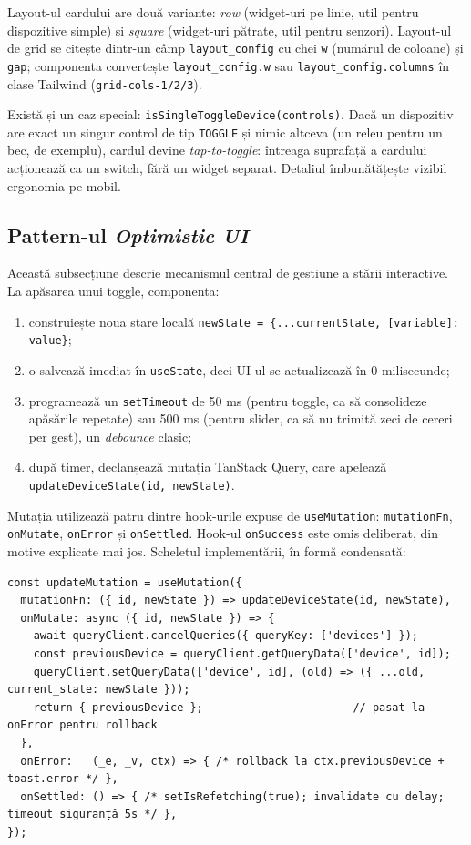 Layout-ul cardului are două variante: \emph{row} (widget-uri pe linie, util pentru dispozitive simple) și \emph{square} (widget-uri pătrate, util pentru senzori). Layout-ul de grid se citește dintr-un câmp \texttt{layout\_config} cu chei \texttt{w} (numărul de coloane) și \texttt{gap}; componenta convertește \texttt{layout\_config.w} sau \texttt{layout\_config.columns} în clase Tailwind (\texttt{grid-cols-1/2/3}).

Există și un caz special: \texttt{isSingleToggleDevice(controls)}. Dacă un dispozitiv are exact un singur control de tip \texttt{TOGGLE} și nimic altceva (un releu pentru un bec, de exemplu), cardul devine \emph{tap-to-toggle}: întreaga suprafață a cardului acționează ca un switch, fără un widget separat. Detaliul îmbunătățește vizibil ergonomia pe mobil.

\subsection{Pattern-ul \textit{Optimistic UI}}
Această subsecțiune descrie mecanismul central de gestiune a stării interactive. La apăsarea unui toggle, componenta:
\begin{enumerate}
    \item construiește noua stare locală \texttt{newState = \{...currentState, [variable]: value\}};
    \item o salvează imediat în \texttt{useState}, deci UI-ul se actualizează în 0 milisecunde;
    \item programează un \texttt{setTimeout} de 50 ms (pentru toggle, ca să consolideze apăsările repetate) sau 500 ms (pentru slider, ca să nu trimită zeci de cereri per gest), un \textit{debounce} clasic;
    \item după timer, declanșează mutația TanStack Query, care apelează \texttt{updateDeviceState(id, newState)}.
\end{enumerate}

Mutația utilizează patru dintre hook-urile expuse de \texttt{useMutation}: \texttt{mutationFn}, \texttt{onMutate}, \texttt{onError} și \texttt{onSettled}. Hook-ul \texttt{onSuccess} este omis deliberat, din motive explicate mai jos. Scheletul implementării, în formă condensată:
\begin{verbatim}
const updateMutation = useMutation({
  mutationFn: ({ id, newState }) => updateDeviceState(id, newState),
  onMutate: async ({ id, newState }) => {
    await queryClient.cancelQueries({ queryKey: ['devices'] });
    const previousDevice = queryClient.getQueryData(['device', id]);
    queryClient.setQueryData(['device', id], (old) => ({ ...old, current_state: newState }));
    return { previousDevice };                       // pasat la onError pentru rollback
  },
  onError:   (_e, _v, ctx) => { /* rollback la ctx.previousDevice + toast.error */ },
  onSettled: () => { /* setIsRefetching(true); invalidate cu delay; timeout siguranță 5s */ },
});
\end{verbatim}

